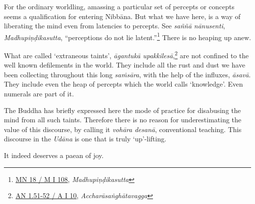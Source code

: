 For the ordinary worldling, amassing a particular set of percepts or concepts seems a qualification for entering Nibbāna. But what we have here, is a way of liberating the mind even from latencies to percepts. See \emph{saññā nānusenti}, \emph{Madhupiṇḍikasutta}, ``perceptions do not lie latent.''\footnote{\href{https://suttacentral.net/mn18/pli/ms}{MN 18 / M I 108}, \emph{Madhupiṇḍikasutta}} There is no heaping up anew.

What are called `extraneous taints', \emph{āgantukā upakkilesā},\footnote{\href{https://suttacentral.net/an1.51-60/pli/ms}{AN 1.51-52 / A I 10}, \emph{Accharāsaṅghātavagga}} are not confined to the well known defilements in the world. They include all the rust and dust we have been collecting throughout this long \emph{saṁsāra}, with the help of the influxes, \emph{āsavā}. They include even the heap of percepts which the world calls `knowledge'. Even numerals are part of it.

The Buddha has briefly expressed here the mode of practice for disabusing the mind from all such taints. Therefore there is no reason for underestimating the value of this discourse, by calling it \emph{vohāra desanā}, conventional teaching. This discourse in the \emph{Udāna} is one that is truly `up'-lifting.

It indeed deserves a paean of joy.
